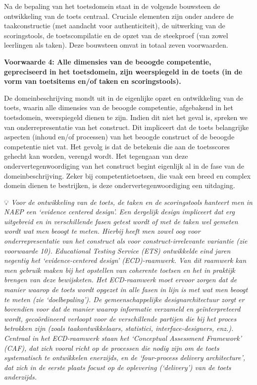 \documentclass[
  letterpaper,
]{report}
\begin{document}
Na de bepaling van het toetsdomein staat in de volgende bouwsteen de
ontwikkeling van de toets centraal. Cruciale elementen zijn onder andere
de taakconstructie (met aandacht voor authenticiteit), de uitwerking van
de scoringstools, de toetscompilatie en de opzet van de steekproef (van
zowel leerlingen als taken). Deze bouwsteen omvat in totaal zeven
voorwaarden.

\textbf{Voorwaarde 4: Alle dimensies van de beoogde competentie,
gepreciseerd in het toetsdomein, zijn weerspiegeld in de toets (in de
vorm van toetsitems en/of taken en scoringstools).}

De domeinbeschrijving mondt uit in de eigenlijke opzet en ontwikkeling
van de toets, waarin alle dimensies van de beoogde competentie,
afgebakend in het toetsdomein, weerspiegeld dienen te zijn. Indien dit
niet het geval is, spreken we van onderrepresentatie van het construct.
Dit impliceert dat de toets belangrijke aspecten (inhoud en/of
processen) van het beoogde construct of de beoogde competentie niet vat.
Het gevolg is dat de betekenis die aan de toetsscores gehecht kan
worden, verengd wordt. Het tegengaan van deze ondervertegenwoordiging
van het construct begint eigenlijk al in de fase van de
domeinbeschrijving. Zeker bij competentietoetsen, die vaak een breed en
complex domein dienen te bestrijken, is deze ondervertegenwoordiging een
uitdaging.

💡 \emph{Voor de ontwikkeling van de toets, de taken en de scoringstools
hanteert men in NAEP een `evidence centered design'. Een dergelijk
design impliceert dat erg uitgebreid en in verschillende fasen getest
wordt of met de taken wel gemeten wordt wat men beoogt te meten. Hierbij
heeft men zowel oog voor onderrepresentatie van het construct als voor
construct-irrelevante variantie (zie voorwaarde 10). Educational Testing
Service (ETS) ontwikkelde eind jaren negentig het `evidence-centered
design' (ECD)-raamwerk. Van dit raamwerk kan men gebruik maken bij het
opstellen van coherente toetsen en het in praktijk brengen van deze
bewijsketen. Het ECD-raamwerk moet ervoor zorgen dat de manier waarop de
toets wordt opgezet in alle fasen in lijn is met wat men beoogt te meten
(zie `doelbepaling'). De gemeenschappelijke designarchitectuur zorgt er
bovendien voor dat de manier waarop informatie verzameld en
geïnterpreteerd wordt, gecoördineerd verloopt voor de verschillende
partijen die bij het proces betrokken zijn (zoals taakontwikkelaars,
statistici, interface-designers, enz.). Centraal in het ECD-raamwerk
staan het `Conceptual Assessment Framework' (CAF), dat zich vooral richt
op de processen die nodig zijn om de toets systematisch te ontwikkelen
enerzijds, en de `four-process delivery architecture', dat zich in de
eerste plaats focust op de oplevering (`delivery') van de toets
anderzijds.}
\end{document}
